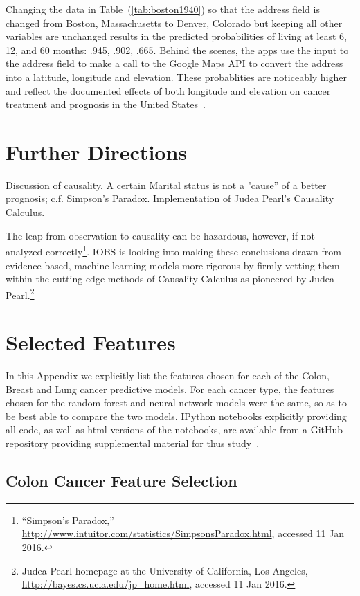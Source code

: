 \documentclass[a4paper,11pt]{article}
\begin{document}
Changing the data in Table~(\ref{tab:boston1940}) so that the address field is changed from Boston, Massachusetts to Denver, Colorado but keeping all other variables are unchanged results in the predicted probabilities of living at least 6, 12, and 60 months: .945, .902, .665. 
Behind the scenes, the apps use the input to the address field to make a call to the Google Maps API to convert the address into a latitude, longitude and elevation.
These probablities are noticeably higher and reflect the documented effects of both longitude and elevation on cancer treatment and prognosis in the United States~\cite{kob4}.


\section{Further Directions}

Discussion of causality. A certain Marital status is not a "cause'' of a better prognosis; c.f. Simpson's Paradox. Implementation of Judea Pearl's Causality Calculus.

The leap from observation to causality can be hazardous, however, if not analyzed correctly\footnote{``Simpson's Paradox,'' \url{http://www.intuitor.com/statistics/SimpsonsParadox.html}, accessed 11 Jan 2016.}.
 IOBS is looking into making these conclusions drawn from evidence-based, machine learning models more rigorous by firmly vetting them within the cutting-edge methods of Causality Calculus as pioneered by Judea Pearl.\footnote{Judea Pearl homepage at the University of California, Los Angeles, \url{http://bayes.cs.ucla.edu/jp_home.html}, accessed 11 Jan 2016.}

\appendix
\section{Selected Features}
\label{sec:features}
In this Appendix we explicitly list the features chosen for each of the Colon, Breast and Lung cancer predictive models. For each cancer type, the features chosen for the random forest and neural network models were the same, so as to be best able to compare the two models.
IPython notebooks explicitly providing all code, as well as html versions of the notebooks, are available from a GitHub repository providing supplemental material for thus study~\cite{supp}.



\subsection{Colon Cancer Feature Selection}
\label{subsec:colonfeatures}
\end{document}
